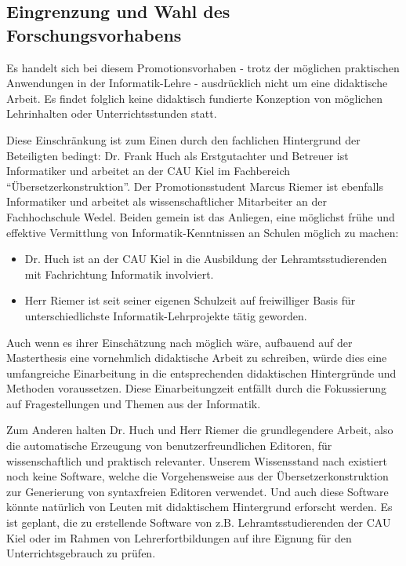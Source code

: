 \documentclass[paper=a4,fontsize=11pt,parskip=half]{scrartcl}
\begin{document}
\subsection{Eingrenzung und Wahl des Forschungsvorhabens}

Es handelt sich bei diesem Promotionsvorhaben - trotz der möglichen praktischen Anwendungen in der Informatik-Lehre - ausdrücklich nicht um eine didaktische Arbeit. Es findet folglich keine didaktisch fundierte Konzeption von möglichen Lehrinhalten oder Unterrichtsstunden statt.

Diese Einschränkung ist zum Einen durch den fachlichen Hintergrund der Beteiligten bedingt: Dr. Frank Huch als Erstgutachter und Betreuer ist Informatiker und arbeitet an der CAU Kiel im Fachbereich \enquote{Übersetzerkonstruktion}. Der Promotionsstudent Marcus Riemer ist ebenfalls Informatiker und arbeitet als wissenschaftlicher Mitarbeiter an der Fachhochschule Wedel. Beiden gemein ist das Anliegen, eine möglichst frühe und effektive Vermittlung von Informatik-Kenntnissen an Schulen möglich zu machen:

\begin{itemize}
\item Dr. Huch ist an der CAU Kiel in die Ausbildung der Lehramtsstudierenden mit Fachrichtung Informatik involviert.
\item Herr Riemer ist seit seiner eigenen Schulzeit auf freiwilliger Basis für unterschiedlichste Informatik-Lehrprojekte tätig geworden.
\end{itemize}

Auch wenn es ihrer Einschätzung nach möglich wäre, aufbauend auf der Masterthesis eine vornehmlich didaktische Arbeit zu schreiben, würde dies eine umfangreiche Einarbeitung in die entsprechenden didaktischen Hintergründe und Methoden voraussetzen. Diese Einarbeitungzeit entfällt durch die Fokussierung auf Fragestellungen und Themen aus der Informatik.

Zum Anderen halten Dr. Huch und Herr Riemer die grundlegendere Arbeit, also die automatische Erzeugung von benutzerfreundlichen Editoren, für wissenschaftlich und praktisch relevanter. Unserem Wissensstand nach existiert noch keine Software, welche die Vorgehensweise aus der Übersetzerkonstruktion zur Generierung von syntaxfreien Editoren verwendet. Und auch diese Software könnte natürlich von Leuten mit didaktischem Hintergrund erforscht werden. Es ist geplant, die zu erstellende Software von z.B. Lehramtsstudierenden der CAU Kiel oder im Rahmen von Lehrerfortbildungen auf ihre Eignung für den Unterrichtsgebrauch zu prüfen.
\end{document}
